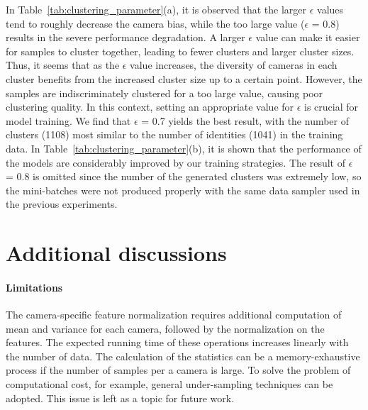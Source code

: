 In Table~\ref{tab:clustering_parameter}(a), it is observed that the larger $\epsilon$ values tend to roughly decrease the camera bias, while the too large value ($\epsilon$ = 0.8) results in the severe performance degradation. 
A larger $\epsilon$ value can make it easier for samples to cluster together, leading to fewer clusters and larger cluster sizes. 
Thus, it seems that as the $\epsilon$ value increases, the diversity of cameras in each cluster benefits from the increased cluster size up to a certain point. 
However, the samples are indiscriminately clustered for a too large value, causing poor clustering quality. 
In this context, setting an appropriate value for $\epsilon$ is crucial for model training. 
We find that $\epsilon$ = 0.7 yields the best result, with the number of clusters (1108) most similar to the number of identities (1041) in the training data. 
In Table~\ref{tab:clustering_parameter}(b), it is shown that the performance of the models are considerably improved by our training strategies.
The result of $\epsilon$ = 0.8 is omitted since the number of the generated clusters was extremely low, so the mini-batches were not produced properly with the same data sampler used in the previous experiments.





\section{Additional discussions}
\label{sup:discussion}

\paragraph{Limitations}
The camera-specific feature normalization requires additional computation of mean and variance for each camera, followed by the normalization on the features.
The expected running time of these operations increases linearly with the number of data.
The calculation of the statistics can be a memory-exhaustive process if the number of samples per a camera is large. 
To solve the problem of computational cost, for example, general under-sampling techniques can be adopted.
This issue is left as a topic for future work.


